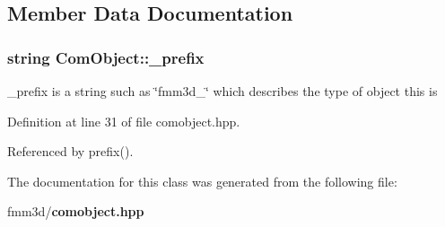 \subsection{Member Data Documentation}
\subsubsection{\setlength{\rightskip}{0pt plus 5cm}string {\bf Com\-Object::\_\-prefix}\hspace{0.3cm}{\tt  [protected]}}\label{classComObject_b933f996cea3f524cf1514eb8539edfa_b933f996cea3f524cf1514eb8539edfa}


\_\-prefix is a string such as \char`\"{}fmm3d\_\-\char`\"{} which describes the type of object this is 

Definition at line 31 of file comobject.hpp.

Referenced by prefix().

The documentation for this class was generated from the following file:\begin{CompactItemize}
\item 
fmm3d/{\bf comobject.hpp}\end{CompactItemize}
